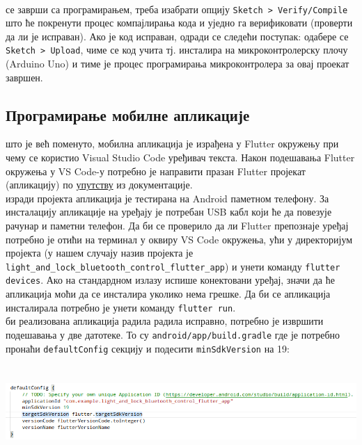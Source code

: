 \documentclass[12pt]{article}
\begin{document}
\vspace{0.3cm}\\
 се заврши са програмирањем, треба изабрати опцију \texttt{Sketch > Verify/Compile} што ће покренути процес компајлирања кода и уједно га верификовати (проверти да ли је исправан). Ако је код исправан, одради се следећи поступак: одабере се \texttt{Sketch > Upload}, чиме се код учита тј. инсталира на микроконтролерску плочу (Arduino Uno) и тиме је процес програмирања микроконтролера за овај проекат завршен.


\subsection{Програмирање мобилне апликације}
 што је већ поменуто, мобилна апликација је израђена у Flutter окружењу при чему се користио Visual Studio Code уређивач текста. Након подешавања Flutter окружења у VS Code-у потребно је направити празан Flutter пројекат (апликацију) по \href{https://docs.flutter.dev/get-started/test-drive?tab=vscode}{упутству} из документације.\\ 
 изради пројекта апликација је тестирана на Android паметном телефону. За инсталацију апликације на уређају је потребан USB кабл који ће да повезује рачунар и паметни телефон. Да би се проверило да ли Flutter препознаје уређај потребно је отићи на терминал у оквиру VS Code окружења, ући у директоријум пројекта (у нашем случају назив пројекта је \texttt{light\_and\_lock\_bluetooth\_control\_flutter\_app}) и унети команду \texttt{flutter devices}. Ако на стандардном излазу испише конектовани уређај, значи да ће апликација моћи да се инсталира уколико нема грешке. Да би се апликација инсталирала потребно је унети команду \texttt{flutter run}.\\
 би реализована апликација радила радила исправно, потребно је извршити подешавања у две датотеке. То су \texttt{android/app/build.gradle} где је потребно пронаћи \texttt{defaultConfig} секцију и подесити \texttt{minSdkVersion} на 19:
\begin{center}
    \centering 
    \includegraphics[height=3.5cm, width=16cm]{images/defaultConfigBuildGradle}
\end{center}
\end{document}
